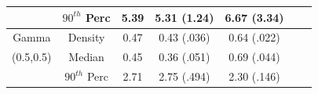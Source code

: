 \documentclass[11pt]{article}
\numberwithin{equation}{section}
\begin{document}
\begin{table}
\begin{center}
\begin{tabular} {| c | c | c | c | c | c | c |}
				& $90^{th}$ Perc&	5.39			& 	5.31 (1.24)		&	6.67 (3.34)	 \\
	

	\hline
	
		 
	 Gamma		& Density		& 	0.47			& 0.43 (.036)			&	0.64 (.022)	\\
	 
	 
	 (0.5,0.5)		& Median 		&	0.45			& 0.36 (.051)			& 	0.69 (.044)	  \\ 
				
				& $90^{th}$ Perc&	2.71			& 2.75 (.494)			&	2.30 (.146)	 \\
	


	\hline		
	
\end{tabular}
\end{center}

\end{table}

 
 
\end{document}
